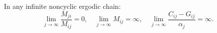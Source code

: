 In any infinite noncyclic ergodic chain:
$$\lim_{j \to \infty} \frac{M_{ji}}{M_{ij}} = 0, \quad \lim_{j \to \infty} M_{ij} = \infty, \quad \lim_{j \to \infty} \frac{C_{ij} - G_{ij}}{\alpha_j} = \infty.$$
